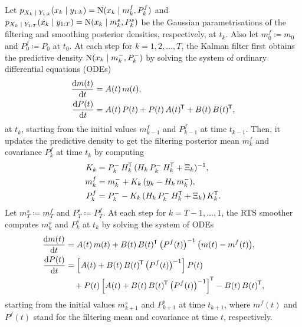 \begin{algorithm}
	\label{alg:kfs}
	Let $p_{X_k {\;|\;} Y_{1:k}}(x_k {\;|\;} y_{1:k}) = \mathrm{N}(x_k{\;|\;} m^f_k, P^f_k)$ and $p_{X_k {\;|\;} Y_{1:T}}(x_k {\;|\;} y_{1:T}) = \mathrm{N}(x_k {\;|\;} m^s_k, P^s_k)$ be the Gaussian parametrisations of the filtering and smoothing posterior densities, respectively, at $t_k$. Also let $m_0^f \coloneqq m_0$ and $P_0^f \coloneqq P_0$ at $t_0$. At each step for $k=1,2,\ldots,T$, the Kalman filter first obtains the predictive density $\mathrm{N}(x_k {\;|\;} m^-_k, P^-_k)$  by solving the system of ordinary differential equations (ODEs)
	\begin{equation}
		\begin{split}
			\frac{\mathop{}\!\mathrm{d} m(t)}{\mathop{}\!\mathrm{d} t} &= A(t) \, m(t), \\
			\frac{\mathop{}\!\mathrm{d} P(t)}{\mathop{}\!\mathrm{d} t} &= A(t) \, P(t) + P(t) \, A(t)^{\mkern-1.5mu\mathsf{T}} + B(t) \, B(t)^{\mkern-1.5mu\mathsf{T}},
			\label{equ:linear-sde-moment-ode}
		\end{split}
	\end{equation}
	at $t_k$, starting from the initial values $m^f_{k-1}$ and $P^f_{k-1}$ at time $t_{k-1}$. Then, it updates the predictive density to get the filtering posterior mean $m^f_k$ and covariance $P^f_k$ at time $t_k$ by computing
	\begin{equation}
		\begin{split}
			K_k &= P^-_k \, H_k^{\mkern-1.5mu\mathsf{T}} \, (H_k \, P^-_k \, H_k^{\mkern-1.5mu\mathsf{T}} + \Xi_k)^{-1},\\
			m^f_k &= m^-_k + K_k \, (y_k - H_k \, m^-_k), \\
			P^f_k &= P^-_k - K_k \, (H_k \, P^-_k \, H_k^{\mkern-1.5mu\mathsf{T}} + \Xi_k) \, K_k^{\mkern-1.5mu\mathsf{T}}.
		\end{split}
		\label{equ:kfs-update}
	\end{equation}
	Let $m^s_T \coloneqq m^f_T$ and $P^s_T \coloneqq P^f_T$. At each step for $k=T-1, \ldots, 1$, the RTS smoother computes $m^s_k$ and $P^s_k$ at $t_k$ by solving the system of ODEs
	\begin{equation}
		\begin{split}
			\frac{\mathop{}\!\mathrm{d} m(t)}{\mathop{}\!\mathrm{d} t} 
			    &= A(t) \, m(t) + B(t) \, B(t)^{\mkern-1.5mu\mathsf{T}} \, \big(P^f(t)\big)^{-1} \, \big(m(t) - m^f(t)\big), \\
			\frac{\mathop{}\!\mathrm{d} P(t)}{\mathop{}\!\mathrm{d} t} 
			    &= \Big[A(t) + B(t) \, B(t)^{\mkern-1.5mu\mathsf{T}} \, \big(P^f(t)\big)^{-1} \Big] \, P(t) \\
			    &\quad+ P(t) \, \Big[A(t) + B(t) \, B(t)^{\mkern-1.5mu\mathsf{T}} \, \big(P^f(t)\big)^{-1} \Big]^{\mkern-1.5mu\mathsf{T}} - B(t) \, B(t)^{\mkern-1.5mu\mathsf{T}},
		\end{split}
	\end{equation}
	starting from the initial values $m^s_{k+1}$ and $P^s_{k+1}$ at time $t_{k+1}$, where $m^f(t)$ and $P^f(t)$ stand for the filtering mean and covariance at time $t$, respectively.
\end{algorithm}

